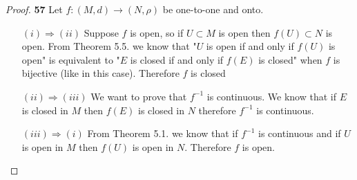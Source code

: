 \documentclass[11pt]{article}
\theoremstyle{definition}
\begin{document}
    \begin{proof}{\textbf{57}}
        Let $f:(M,d) \to (N, \rho)$ be one-to-one and onto.
        \begin{itemize}
        \item [$(i) \Rightarrow (ii)$]
        Suppose $f$ is open, so if  $U \subset M$ is open then
        $f(U) \subset N$ is open.
        From Theorem 5.5. we know that "$U$ is open if and only if $f(U)$ is open"
        is equivalent to "$E$ is closed if and only if $f(E)$ is closed"
        when $f$ is bijective (like in this case). Therefore $f$ is closed


        \item [$(ii) \Rightarrow (iii)$] We want to prove that $f^{-1}$ is
        continuous.
        We know that if $E$ is closed in $M$ then $f(E)$ is closed in $N$
        therefore $f^{-1}$ is continuous.
        
        \item [$(iii) \Rightarrow (i)$] From Theorem 5.1. we know that if
        $f^{-1}$ is continuous and if $U$ is open in $M$ then $f(U)$ is open
        in $N$. Therefore $f$ is open.
        \end{itemize}
        
    \end{proof}
\cleardoublepage
\end{document}
